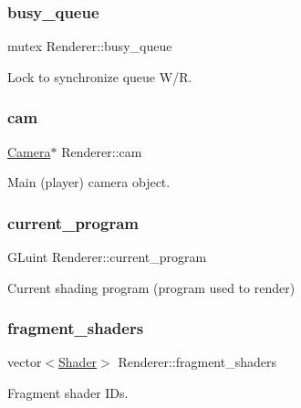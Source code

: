 \subsubsection{\texorpdfstring{busy\+\_\+queue}{busy\_queue}}
{\footnotesize\ttfamily mutex Renderer\+::busy\+\_\+queue}



Lock to synchronize queue W/R. 

\mbox{\label{classRenderer_a83cc09617ebb267932620bce0a69c540}} 
\subsubsection{\texorpdfstring{cam}{cam}}
{\footnotesize\ttfamily \mbox{\hyperlink{classCamera}{Camera}}$\ast$ Renderer\+::cam}



Main (player) camera object. 

\mbox{\label{classRenderer_a1012d49fe5c011d92d8997c448b2e7ea}} 
\subsubsection{\texorpdfstring{current\+\_\+program}{current\_program}}
{\footnotesize\ttfamily G\+Luint Renderer\+::current\+\_\+program}



Current shading program (program used to render) 

\mbox{\label{classRenderer_a7dd27df94abb2368cb00db0f76ff0c66}} 
\subsubsection{\texorpdfstring{fragment\+\_\+shaders}{fragment\_shaders}}
{\footnotesize\ttfamily vector$<$\mbox{\hyperlink{classShader}{Shader}}$>$ Renderer\+::fragment\+\_\+shaders\hspace{0.3cm}{\ttfamily [private]}}



Fragment shader I\+Ds. 

